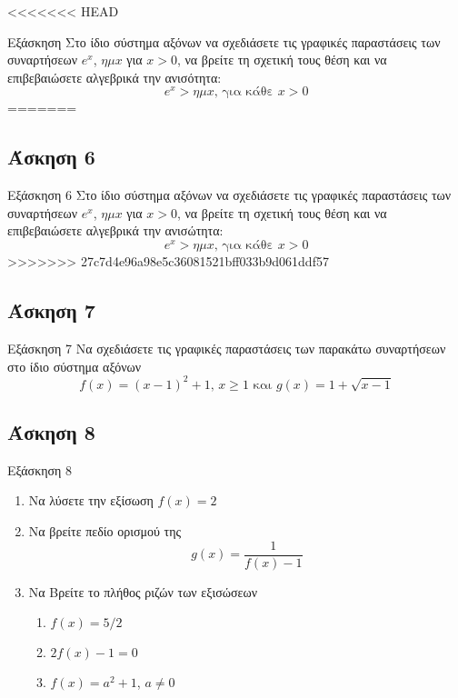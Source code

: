 \documentclass[greek]{beamer}
\begin{document}
<<<<<<< HEAD
\begin{frame}{Εξάσκηση}
Στο ίδιο σύστημα αξόνων να σχεδιάσετε τις γραφικές παραστάσεις των συναρτήσεων $e^x$, $ημ x$ για $x>0$, να βρείτε τη σχετική τους θέση και να επιβεβαιώσετε αλγεβρικά την ανισότητα:
$$e^x>ημ x \text{, για κάθε } x>0$$
=======
\subsection{Άσκηση 6}
\begin{frame}[label=Άσκηση6,t]{Εξάσκηση 6}
      Στο ίδιο σύστημα αξόνων να σχεδιάσετε τις γραφικές παραστάσεις των συναρτήσεων $e^x$, $ημ x$ για $x>0$, να βρείτε τη σχετική τους θέση και να επιβεβαιώσετε αλγεβρικά την ανισώτητα:
      $$e^x>ημ x \text{, για κάθε } x>0$$
      >>>>>>> 27c7d4e96a98e5c36081521bff033b9d061ddf57
\end{frame}

\subsection{Άσκηση 7}
\begin{frame}[label=Άσκηση7,t]{Εξάσκηση 7}
      Να σχεδιάσετε τις γραφικές παραστάσεις των παρακάτω συναρτήσεων στο ίδιο σύστημα αξόνων
      $$f(x)=(x-1)^2+1\text{, } x\ge 1 \text{ και } g(x)=1+\sqrt{x-1}$$
\end{frame}

\subsection{Άσκηση 8}
\begin{frame}[label=Άσκηση8,t]{Εξάσκηση 8}
      \href{https://www.geogebra.org/m/euy2uhma}{}
      \begin{enumerate}
            \item<1-> Να λύσετε την εξίσωση $f(x)=2$
            \item<2-> Να βρείτε πεδίο ορισμού της $$g(x)=\frac{1}{f(x)-1}$$
            \item<3-> Να Βρείτε το πλήθος ριζών των εξισώσεων
                  \begin{enumerate}
                        \item<4-> $f(x)=5/2$
                        \item<5-> $2f(x)-1=0$
                        \item<6-> $f(x)=a^2+1$, $a\ne 0$
                  \end{enumerate}
      \end{enumerate}
\end{frame}


\end{frame}
\end{document}
